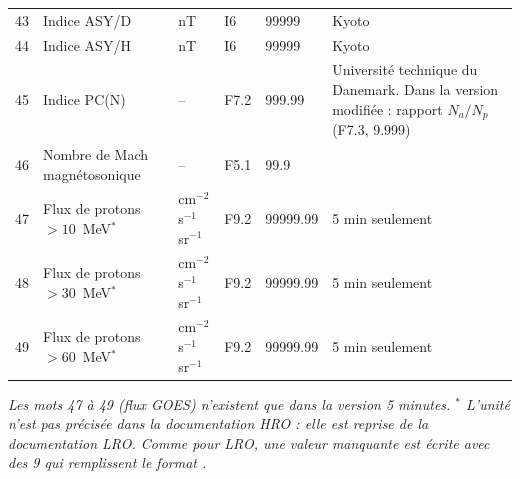 \begin{longtable}{r p{5.0cm} p{2.0cm} l l p{3.3cm}}
43 & Indice ASY/D & nT & I6 & 99999 & Kyoto \\
44 & Indice ASY/H & nT & I6 & 99999 & Kyoto \\
45 & Indice PC(N) & -- & F7.2 & 999.99 & Université technique du Danemark. Dans la version modifiée : rapport $N_a/N_p$ (F7.3, 9.999) \\
46 & Nombre de Mach magnétosonique & -- & F5.1 & 99.9 & \\
47 & Flux de protons $>10$~MeV$^{*}$ & cm$^{-2}$ s$^{-1}$ sr$^{-1}$ & F9.2 & 99999.99 & 5 min seulement \\
48 & Flux de protons $>30$~MeV$^{*}$ & cm$^{-2}$ s$^{-1}$ sr$^{-1}$ & F9.2 & 99999.99 & 5 min seulement \\
49 & Flux de protons $>60$~MeV$^{*}$ & cm$^{-2}$ s$^{-1}$ sr$^{-1}$ & F9.2 & 99999.99 & 5 min seulement \\
\end{longtable}
\endgroup

\textit{Les mots 47 à 49 (flux GOES) n'existent que dans la version 5 minutes. $^{*}$ L'unité n'est pas précisée dans la documentation HRO : elle est reprise de la documentation LRO. Comme pour LRO, une valeur manquante est écrite avec des 9 qui remplissent le format \cite{OMNI_HRO_doc}.}